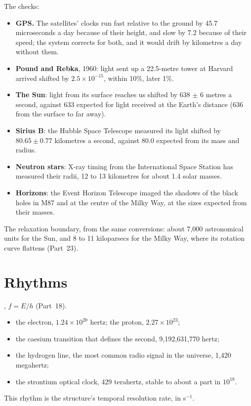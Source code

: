 \documentclass[11pt,a4paper]{article}
\begin{document}
The checks:
\begin{itemize}
\item \textbf{GPS.} The satellites' clocks run fast relative to the ground by 45.7 microseconds a day because of their height, and slow by 7.2 because of their speed; the system corrects for both, and it would drift by kilometres a day without them.
\item \textbf{Pound and Rebka}, 1960: light sent up a 22.5-metre tower at Harvard arrived shifted by $2.5\times10^{-15}$, within 10\%, later 1\%.
\item \textbf{The Sun}: light from its surface reaches us shifted by 638 $\pm$ 6 metres a second, against 633 expected for light received at the Earth's distance (636 from the surface to far away).
\item \textbf{Sirius B}: the Hubble Space Telescope measured its light shifted by $80.65\pm0.77$ kilometres a second, against 80.0 expected from its mass and radius.
\item \textbf{Neutron stars}: X-ray timing from the International Space Station has measured their radii, 12 to 13 kilometres for about 1.4 solar masses.
\item \textbf{Horizons}: the Event Horizon Telescope imaged the shadows of the black holes in M87 and at the centre of the Milky Way, at the sizes expected from their masses.
\end{itemize}
The relaxation boundary, from the same conversions: about 7,000 astronomical units for the Sun, and 8 to 11 kiloparsecs for the Milky Way, where its rotation curve flattens (Part~23).

\section{Rhythms}
\label{sec:rhythms}

, $f=E/h$ (Part~18).
\begin{itemize}
\item the electron, $1.24\times10^{20}$ hertz; the proton, $2.27\times10^{23}$;
\item the caesium transition that defines the second, 9,192,631,770 hertz;
\item the hydrogen line, the most common radio signal in the universe, 1,420 megahertz;
\item the strontium optical clock, 429 terahertz, stable to about a part in $10^{18}$.
\end{itemize}
This rhythm is the structure's temporal resolution rate, in s$^{-1}$.
\end{document}
